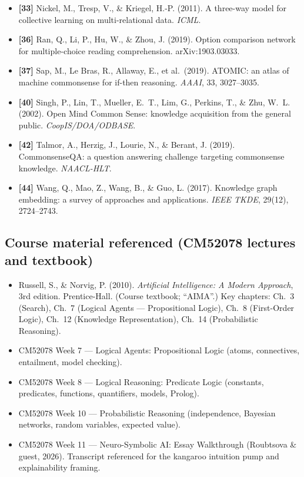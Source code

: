 \documentclass[11pt, a4paper]{article}
\begin{document}
\begin{itemize}[itemsep=0.1em, leftmargin=*]
  \item \textbf{[33]} Nickel, M., Tresp, V., \& Kriegel, H.-P. (2011). A three-way model for collective learning on multi-relational data. \emph{ICML}.
  \item \textbf{[36]} Ran, Q., Li, P., Hu, W., \& Zhou, J. (2019). Option comparison network for multiple-choice reading comprehension. arXiv:1903.03033.
  \item \textbf{[37]} Sap, M., Le Bras, R., Allaway, E., et al.\ (2019). ATOMIC: an atlas of machine commonsense for if-then reasoning. \emph{AAAI}, 33, 3027--3035.
  \item \textbf{[40]} Singh, P., Lin, T., Mueller, E.\ T., Lim, G., Perkins, T., \& Zhu, W.\ L. (2002). Open Mind Common Sense: knowledge acquisition from the general public. \emph{CoopIS/DOA/ODBASE}.
  \item \textbf{[42]} Talmor, A., Herzig, J., Lourie, N., \& Berant, J. (2019). CommonsenseQA: a question answering challenge targeting commonsense knowledge. \emph{NAACL-HLT}.
  \item \textbf{[44]} Wang, Q., Mao, Z., Wang, B., \& Guo, L. (2017). Knowledge graph embedding: a survey of approaches and applications. \emph{IEEE TKDE}, 29(12), 2724--2743.
\end{itemize}

\subsection*{Course material referenced (CM52078 lectures and textbook)}
\begin{itemize}[itemsep=0.1em, leftmargin=*]
  \item Russell, S., \& Norvig, P. (2010). \emph{Artificial Intelligence: A Modern Approach}, 3rd edition. Prentice-Hall. (Course textbook; ``AIMA''.) Key chapters: Ch.\ 3 (Search), Ch.\ 7 (Logical Agents — Propositional Logic), Ch.\ 8 (First-Order Logic), Ch.\ 12 (Knowledge Representation), Ch.\ 14 (Probabilistic Reasoning).
  \item CM52078 Week 7 — Logical Agents: Propositional Logic (atoms, connectives, entailment, model checking).
  \item CM52078 Week 8 — Logical Reasoning: Predicate Logic (constants, predicates, functions, quantifiers, models, Prolog).
  \item CM52078 Week 10 — Probabilistic Reasoning (independence, Bayesian networks, random variables, expected value).
  \item CM52078 Week 11 — Neuro-Symbolic AI: Essay Walkthrough (Roubtsova \& guest, 2026). Transcript referenced for the kangaroo intuition pump and explainability framing.
\end{itemize}
\end{document}
